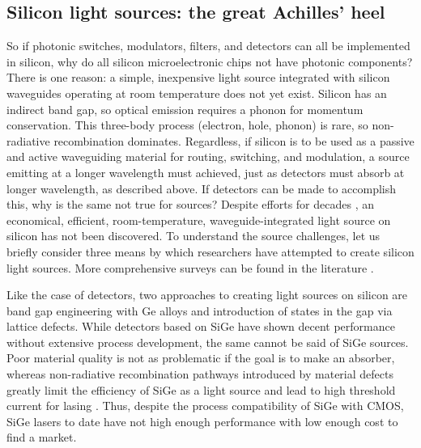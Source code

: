 \documentclass[twocolumn]{article}
\begin{document}
\subsection{Silicon light sources: the great Achilles' heel}
So if photonic switches, modulators, filters, and detectors can all be implemented in silicon, why do all silicon microelectronic chips not have photonic components? There is one reason: a simple, inexpensive light source integrated with silicon waveguides operating at room temperature does not yet exist. Silicon has an indirect band gap, so optical emission requires a phonon for momentum conservation. This three-body process (electron, hole, phonon) is rare, so non-radiative recombination dominates. Regardless, if silicon is to be used as a passive and active waveguiding material for routing, switching, and modulation, a source emitting at a longer wavelength must achieved, just as detectors must absorb at longer wavelength, as described above. If detectors can be made to accomplish this, why is the same not true for sources? Despite efforts for decades \cite{shxu2007}, an economical, efficient, room-temperature, waveguide-integrated light source on silicon has not been discovered. To understand the source challenges, let us briefly consider three means by which researchers have attempted to create silicon light sources. More comprehensive surveys can be found in the literature \cite{li2005,shxu2007,libo2010,zhyi2015}.

Like the case of detectors, two approaches to creating light sources on silicon are band gap engineering with Ge alloys and introduction of states in the gap via lattice defects. While detectors based on SiGe have shown decent performance without extensive process development, the same cannot be said of SiGe sources. Poor material quality is not as problematic if the goal is to make an absorber, whereas non-radiative recombination pathways introduced by material defects greatly limit the efficiency of SiGe as a light source and lead to high threshold current for lasing \cite{zhyi2015}. Thus, despite the process compatibility of SiGe with CMOS, SiGe lasers to date have not high enough performance with low enough cost to find a market. 
\end{document}
